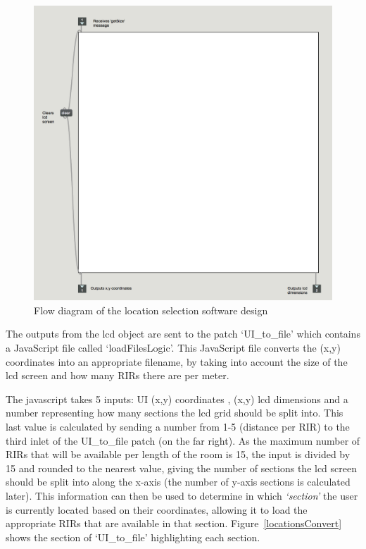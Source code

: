 \documentclass[../../main.tex]{subfiles}
\begin{document}
			\begin{figure}[H]
				\centerline{\includegraphics[scale = 0.4]{Sections/Implementation/Max/images/Max/lcd.png}}
				\caption{Flow diagram of the location selection software design}
				\label{lcd}
			\end{figure}

			The outputs from the lcd object are sent to the patch ‘UI\_to\_file’ which contains a JavaScript file called ‘loadFilesLogic’. This JavaScript file converts the (x,y) coordinates into an appropriate filename, by taking into account the size of the lcd screen and how many RIRs there are per meter.

			The javascript takes 5 inputs: UI (x,y) coordinates , (x,y) lcd dimensions and a number representing how many sections the lcd grid should be split into. This last value is calculated by sending a number from 1-5 (distance per RIR) to the third inlet of the UI\_to\_file patch (on the far right). As the maximum number of RIRs that will be available per length of the room is 15, the input is divided by 15 and rounded to the nearest value, giving the number of sections the lcd screen should be split into along the x-axis (the number of y-axis sections is calculated later). This information can then be used to determine in which \textit{‘section’} the user is currently located based on their coordinates, allowing it to load the appropriate RIRs that are available in that section. Figure~\ref{locationsConvert} shows the section of `UI\_to\_file' highlighting each section.
\end{document}
